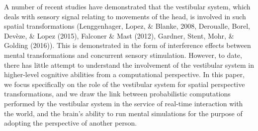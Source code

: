 \documentclass[english,floatsintext,man]{apa6}
\theoremstyle{definition}
\theoremstyle{definition}
\theoremstyle{remark}
\begin{document}
A number of recent studies have demonstrated that the vestibular system,
which deals with sensory signal relating to movements of the head, is
involved in such spatial transformations (Lenggenhager, Lopez, \&
Blanke, 2008, Deroualle, Borel, Devèze, \& Lopez (2015), Falconer \&
Mast (2012), Gardner, Stent, Mohr, \& Golding (2016)). This is
demonstrated in the form of interference effects between mental
transformations and concurrent sensory stimulation. However, to date,
there has little attempt to understand the involvement of the vestibular
system in higher-level cognitive abilities from a computational
perspective. In this paper, we focus specifically on the role of the
vestibular system for spatial perspective transformations, and we draw
the link between probabilistic computations performed by the vestibular
system in the service of real-time interaction with the world, and the
brain's ability to run mental simulations for the purpose of adopting
the perspective of another person.
\end{document}
